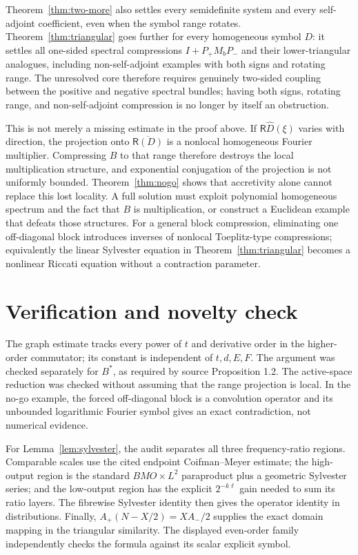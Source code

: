 \documentclass[11pt]{article}
\newcommand{\Ran}{\mathsf R}
\begin{document}
Theorem~\ref{thm:two-more} also settles every semidefinite system and every
self-adjoint coefficient, even when the symbol range rotates.
Theorem~\ref{thm:triangular} goes further for every homogeneous symbol $D$:
it settles all one-sided spectral compressions $I+P_+M_bP_-$ and their
lower-triangular analogues, including non-self-adjoint examples with both
signs and rotating range.
The unresolved core therefore requires genuinely two-sided coupling between
the positive and negative spectral bundles; having both signs, rotating
range, and non-self-adjoint compression is no longer by itself an obstruction.

This is not merely a missing estimate in the proof above. If
$\Ran\widehat D(\xi)$ varies with direction, the projection onto
$\overline{\Ran(D)}$ is a nonlocal homogeneous Fourier multiplier. Compressing
$B$ to that range therefore destroys the local multiplication structure, and
exponential conjugation of the projection is not uniformly bounded.
Theorem~\ref{thm:nogo} shows that accretivity alone cannot replace this lost
locality. A full solution must exploit polynomial homogeneous spectrum and
the fact that $B$ is multiplication, or construct a Euclidean example that
defeats those structures.  For a general block compression, eliminating one
off-diagonal block introduces inverses of nonlocal Toeplitz-type compressions;
equivalently the linear Sylvester equation in
Theorem~\ref{thm:triangular} becomes a nonlinear Riccati equation without a
contraction parameter.

\section*{Verification and novelty check}
The graph estimate tracks every power of $t$ and derivative order in the
higher-order commutator; its constant is independent of $t,d,E,F$. The
argument was checked separately for $B^*$, as required by source Proposition
1.2. The active-space reduction was checked without assuming that the range
projection is local. In the no-go example, the forced off-diagonal block is a
convolution operator and its unbounded logarithmic Fourier symbol gives an
exact contradiction, not numerical evidence.

For Lemma~\ref{lem:sylvester}, the audit separates all three frequency-ratio
regions.  Comparable scales use the cited endpoint Coifman--Meyer estimate;
the high-output region is the standard $BMO\times L^2$ paraproduct plus a
geometric Sylvester series; and the low-output region has the explicit
$2^{-k\ell}$ gain needed to sum its ratio layers.  The fibrewise Sylvester
identity then gives the operator identity in distributions.  Finally,
$A_+(N-X/2)=XA_-/2$ supplies the exact domain mapping in the triangular
similarity.  The displayed even-order family independently checks the formula
against its scalar explicit symbol.
\end{document}
